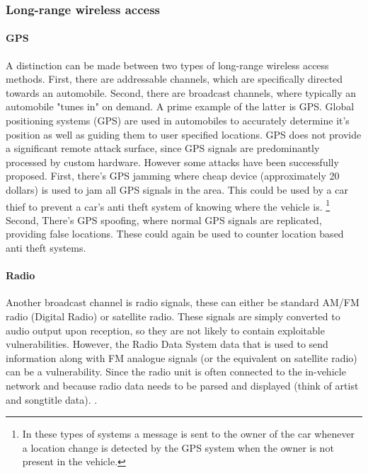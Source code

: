 \documentclass[11pt]{article}
\begin{document}
\subsubsection{Long-range wireless access}

\paragraph{GPS} A distinction can be made between two types of long-range wireless access methods. First, there are addressable channels, which are specifically directed towards an automobile. Second, there are broadcast channels, where typically an automobile "tunes in" on demand. A prime example of the latter is GPS. Global positioning systems (GPS) are used in automobiles to accurately determine it's position as well as guiding them to user specified locations. GPS does not provide a significant remote attack surface, since GPS signals are predominantly processed by custom hardware\cite{Kosher}. However some attacks have been successfully proposed. First, there's GPS jamming where cheap device (approximately 20 dollars) is used to jam all GPS signals in the area. This could be used by a car thief to prevent a car's anti theft system of knowing where the vehicle is. \footnote{In these types  of systems a message is sent to the owner of the car whenever a location change is detected by the GPS system when the owner is not present in the vehicle.} Second, There's GPS spoofing, where normal GPS signals are replicated, providing false locations. These could again be used to counter location based anti theft systems. \cite{Petit} 

\paragraph{Radio} Another broadcast channel is radio signals, these can either be standard AM/FM radio (Digital Radio) or satellite radio. These signals are simply converted to audio output upon reception, so they are not likely to contain exploitable vulnerabilities. However, the Radio Data System data that is used to send information along with FM analogue signals (or the equivalent on satellite radio) can be a vulnerability. Since the radio unit is often connected to the in-vehicle network and because radio data needs to be parsed and displayed (think of artist and songtitle data). \cite{MillerA}\cite{MillerD}\cite{Kosher}. 
\end{document}
